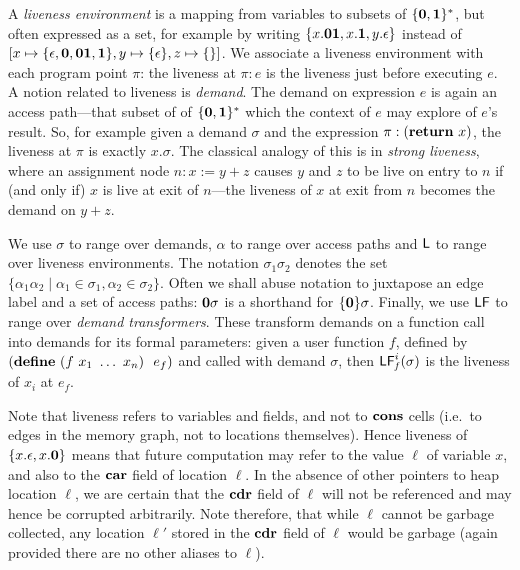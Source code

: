 \documentclass{sig-alternate}
\begin{document}
A {\em liveness environment} is a mapping from variables to subsets of
$\{\mathbf{0},\mathbf{1}\}^\ast$, but  often expressed as a set,  for example by
writing  $\{x.\mathbf{0}\mathbf{1},   x.\mathbf{1},  y.\epsilon\}$  instead   of  $[x
  \mapsto\{\epsilon,\mathbf{0},\mathbf{0}\mathbf{1},\mathbf{1}\},     y\mapsto\{\epsilon\},
  z\mapsto\{\}]$.   We  associate  a  liveness environment  with  each
program  point $\pi$:  the liveness  at $\pi:e$  is the  liveness just
before executing $e$.
A  notion  related  to  liveness  is {\em  demand}.   The  demand on
expression  $e$   is  again  an   access  path---that  subset   of  of
$\{\mathbf{0},\mathbf{1}\}^\ast$ which  the context of $e$ may  explore of $e$'s
result.  So,  for example given  a demand $\sigma$ and  the expression
$\pi: (\mbox{$\mathbf{ return}$}\ x)$, the liveness at $\pi$ is exactly $x.\sigma$.  The
classical  analogy of  this  is  in {\em  strong  liveness}, where  an
assignment node $n: x:=y+z$ causes $y$  and $z$ to be live on entry to
$n$ if (and only if) $x$ is  live at exit of $n$---the liveness of $x$
at exit from $n$ becomes the demand on $y+z$.


We use $\sigma$  to range over demands, $\alpha$  to range over access
paths  and $\mathsf{L}$  to range  over liveness  environments.  The notation
$\sigma_1\sigma_2$  denotes  the  set $\lbrace  \alpha_1\alpha_2  \mid
\alpha_1 \in  \sigma_1, \alpha_2 \in \sigma_2\rbrace$.  Often we shall
abuse notation to  juxtapose an edge label and a  set of access paths:
$\mathbf{0}\sigma$   is   a   shorthand  for   $\lbrace\mathbf{0}\rbrace\sigma$.
Finally,  we use $\mathsf{LF}$  to range  over {\em  demand transformers}.
These transform demands on a function call into demands for its formal
parameters:    given    a    user    function    $f$,    defined    by
$(\DEFINE\  (f\ x_1\  \ldots\ x_n)\  \  e_f)$ and  called with  demand
$\sigma$, then $\mathsf{LF}_{\mathit f}^{i}( {\mathit \sigma})$ is the liveness of $x_i$ at $e_f$.

Note that liveness refers to  variables and fields, and not to $\mbox{$\mathbf{cons}$}$
cells  (i.e.\  to  edges  in   the  memory  graph,  not  to  locations
themselves).   Hence liveness  of $\{x.\epsilon,x.\mathbf{0}\}$  means that
future computation may refer to  the value $\ell$ of variable $x$, and
also to the $\mbox{$\mathbf{car}$}$ field of  location $\ell$.  In the absence of other
pointers to heap location $\ell$, we are certain that the $\mbox{$\mathbf{cdr}$}$ field
of  $\ell$  will  not  be   referenced  and  may  hence  be  corrupted
arbitrarily.   Note therefore,  that  while $\ell$  cannot be  garbage
collected, any location  $\ell'$ stored in the $\mbox{$\mathbf{cdr}$}$  field of $\ell$
would  be  garbage (again  provided  there  are  no other  aliases  to
$\ell$).
\end{document}
